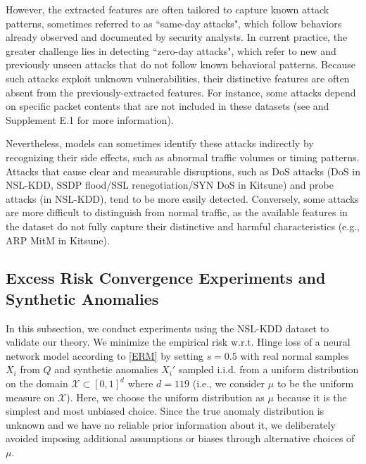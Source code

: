 \documentclass{article}
\begin{document}
However, the extracted features are often tailored to capture known attack patterns, sometimes referred to as ``same-day attacks", which follow behaviors already observed and documented by security analysts.
In current practice, the greater challenge lies in detecting  ``zero-day attacks", which refer to new and previously unseen attacks that do not follow known behavioral patterns. Because such attacks exploit unknown vulnerabilities, their distinctive features are often absent from the previously-extracted features. For instance, some attacks depend on specific packet contents that are not included in these datasets (see \citet{features_ad_kdd_wenke, data_mining_ad_kdd_wenke, info_theoretic_ad_kdd_wenke, mcpad_one_class_ensemble_wenke} and Supplement E.1 for more information).

Nevertheless, models can sometimes identify these attacks indirectly by recognizing their side effects, such as abnormal traffic volumes or timing patterns. Attacks that cause clear and measurable disruptions, such as  DoS attacks (DoS in NSL-KDD, SSDP flood/SSL renegotiation/SYN DoS in Kitsune) and probe attacks (in NSL-KDD), tend to be more easily detected. Conversely, some attacks are more difficult to distinguish from normal traffic, as the available features in the dataset do not fully capture their distinctive and harmful characteristics (e.g., ARP MitM in Kitsune).








\subsection{Excess Risk Convergence Experiments and Synthetic Anomalies}
In this subsection, we conduct experiments using the  NSL-KDD dataset to validate our theory.
We minimize the empirical risk w.r.t. Hinge loss of a neural network model according to \eqref{ERM} by setting $s=0.5$ with real normal samples $X_i$ from $Q$ and synthetic anomalies $X_i'$ sampled i.i.d. from a uniform distribution on the domain $\mathcal{X} \subset [0,1]^d$ where $d=119$ (i.e., we consider $\mu$ to be the uniform measure on $\mathcal X$).
Here, we choose the uniform distribution as $\mu$ because it is the simplest and most unbiased choice. Since the true anomaly distribution is unknown and we have no reliable prior information about it, we deliberately avoided imposing additional assumptions or biases through alternative choices of $\mu$.
\end{document}
